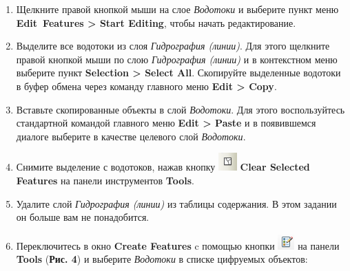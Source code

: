 \documentclass[]{book}
\theoremstyle{definition}
\theoremstyle{definition}
\theoremstyle{definition}
\theoremstyle{remark}
\begin{document}
\begin{enumerate}
\def\labelenumi{\arabic{enumi}.}
\item
  Щелкните правой кнопкой мыши на слое \emph{Водотоки} и выберите пункт
  меню \textbf{Edit~Features \textgreater{} Start Editing}, чтобы начать
  редактирование.
\item
  Выделите все водотоки из слоя \emph{Гидрография (линии)}. Для этого
  щелкните правой кнопкой мыши по слою \emph{Гидрография (линии)} и в
  контекстном меню выберите пункт \textbf{Selection \textgreater{}
  Select All}. Скопируйте выделенные водотоки в буфер обмена через
  команду главного меню \textbf{Edit \textgreater{} Copy}.
\item
  Вставьте скопированные объекты в слой \emph{Водотоки}. Для этого
  воспользуйтесь стандартной командой главного меню \textbf{Edit
  \textgreater{} Paste} и в появившемся диалоге выберите в качестве
  целевого слой \emph{Водотоки}.
\item
  Снимите выделение с водотоков, нажав кнопку
  \includegraphics{images/Ex13/image10.png} \textbf{Clear Selected
  Features} на панели инструментов \textbf{Tools}.
\item
  Удалите слой \emph{Гидрография (линии)} из таблицы содержания. В этом
  задании он больше вам не понадобится.
\item
  Переключитесь в окно \textbf{Create Features} c помощью кнопки
  \includegraphics{images/Ex13/image11.png} на панели \textbf{Tools}
  (\textbf{Рис. 4}) и выберите \emph{Водотоки} в списке цифруемых
  объектов:


\end{enumerate}
\end{document}
